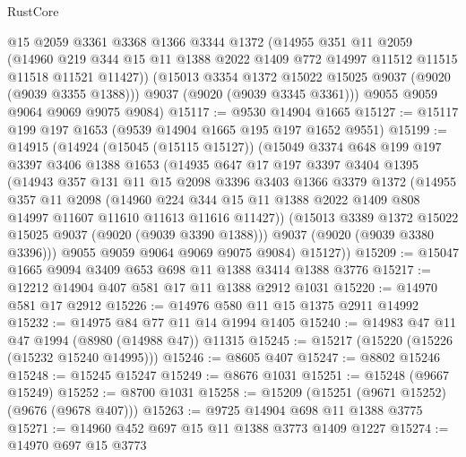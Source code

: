 \begin{lexlean}{RustCore}
\begin{coremodule}
        @15
        @2059
        @3361
        @3368
        @1366
        @3344
        @1372
        (@14955
          @351
          @11
          @2059
          (@14960
            @219
            @344
            @15
            @11
            @1388
            @2022
            @1409
            @772
            @14997
            @11512
            @11515
            @11518
            @11521
            @11427))
        (@15013 @3354 @1372 @15022 @15025 @9037 (@9020 (@9039 @3355 @1388)))
        @9037
        (@9020 (@9039 @3345 @3361)))
      @9055
      @9059
      @9064
      @9069
      @9075
      @9084)
@15117 := @9530 @14904 @1665
@15127 := @15117 @199 @197 @1653 (@9539 @14904 @1665 @195 @197 @1652 @9551)
@15199 := @14915
    (@14924
      (@15045 (@15115 @15127))
      (@15049
        @3374
        @648
        @199
        @197
        @3397
        @3406
        @1388
        @1653
        (@14935
          @647
          @17
          @197
          @3397
          @3404
          @1395
          (@14943
            @357
            @131
            @11
            @15
            @2098
            @3396
            @3403
            @1366
            @3379
            @1372
            (@14955
              @357
              @11
              @2098
              (@14960
                @224
                @344
                @15
                @11
                @1388
                @2022
                @1409
                @808
                @14997
                @11607
                @11610
                @11613
                @11616
                @11427))
            (@15013 @3389 @1372 @15022 @15025 @9037 (@9020 (@9039 @3390 @1388)))
            @9037
            (@9020 (@9039 @3380 @3396)))
          @9055
          @9059
          @9064
          @9069
          @9075
          @9084)
        @15127))
@15209 := @15047 @1665 @9094 @3409 @653 @698 @11 @1388 @3414 @1388 @3776
@15217 := @12212 @14904 @407 @581 @17 @11 @1388 @2912 @1031
@15220 := @14970 @581 @17 @2912
@15226 := @14976 @580 @11 @15 @1375 @2911 @14992
@15232 := @14975 @84 @77 @11 @14 @1994 @1405
@15240 := @14983 @47 @11 @47 @1994 (@8980 (@14988 @47)) @11315
@15245 := @15217 (@15220 (@15226 (@15232 @15240 @14995)))
@15246 := @8605 @407
@15247 := @8802 @15246
@15248 := @15245 @15247
@15249 := @8676 @1031
@15251 := @15248 (@9667 @15249)
@15252 := @8700 @1031
@15258 := @15209 (@15251 (@9671 @15252) (@9676 (@9678 @407)))
@15263 := @9725 @14904 @698 @11 @1388 @3775
@15271 := @14960 @452 @697 @15 @11 @1388 @3773 @1409 @1227
@15274 := @14970 @697 @15 @3773

\end{coremodule}
\end{lexlean}
